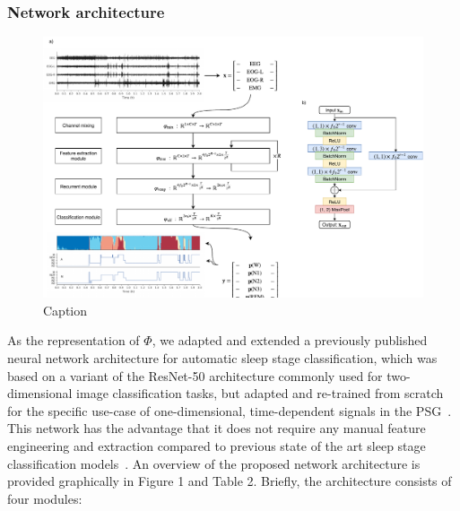 \subsubsection{Network architecture}
\begin{figure}
    \includegraphics[width=\textwidth+\marginparwidth+\marginparsep]{figures/paper-ii/figure_01_a-b.pdf}
    \caption{Caption}
    \label{fig:paper-ii-figure1}
\end{figure}
As the representation of $\Phi$, we adapted and extended a previously published neural network architecture for automatic sleep stage classification, which was based on a variant of the ResNet-50 architecture commonly used for two-dimensional image classification tasks, but adapted and re-trained from scratch for the specific use-case of one-dimensional, time-dependent signals in the PSG~\cite{Olesen2018c}.
This network has the advantage that it does not require any manual feature engineering and extraction compared to previous state of the art sleep stage classification models~\cite{Stephansen2018}.
An overview of the proposed network architecture is provided graphically in Figure 1 and Table 2.
Briefly, the architecture consists of four modules:
